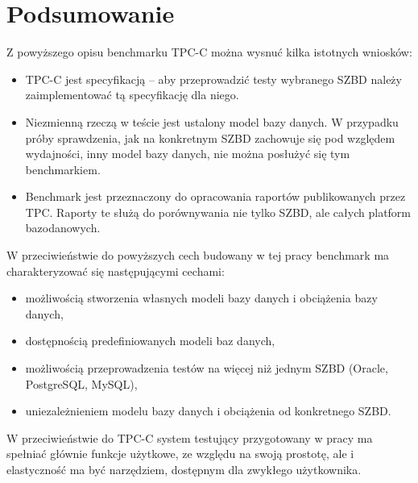 \section{Podsumowanie}
Z powyższego opisu benchmarku TPC-C można wysnuć kilka istotnych wniosków:
\begin{itemize}
\item TPC-C jest specyfikacją -- aby przeprowadzić testy wybranego SZBD należy zaimplementować tą specyfikację dla niego.
\item Niezmienną rzeczą w teście jest ustalony model bazy danych. W przypadku próby sprawdzenia,
jak na konkretnym SZBD zachowuje się pod względem wydajności, inny model bazy danych, nie można
posłużyć się tym benchmarkiem.
\item Benchmark jest przeznaczony do opracowania raportów publikowanych przez TPC. Raporty te służą
do porównywania nie tylko SZBD, ale całych platform bazodanowych.
\end{itemize}
W przeciwieństwie do powyższych cech budowany w tej pracy benchmark ma charakteryzować się
następującymi cechami:
\begin{itemize}
\item możliwością stworzenia własnych modeli bazy danych i obciążenia bazy danych,
\item dostępnością predefiniowanych modeli baz danych,
\item możliwością przeprowadzenia testów na więcej niż jednym SZBD (Oracle, PostgreSQL, MySQL),
\item uniezależnieniem modelu bazy danych i obciążenia od konkretnego SZBD. 
\end{itemize}
W przeciwieństwie do TPC-C system testujący przygotowany w pracy ma spełniać głównie funkcje użytkowe, 
ze względu na swoją prostotę, ale i elastyczność ma być narzędziem, dostępnym dla zwykłego użytkownika.

